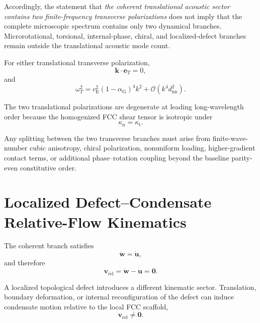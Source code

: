 Accordingly, the statement that \textit{the coherent translational acoustic sector contains two finite-frequency transverse polarizations} does not imply that the complete microscopic spectrum contains only two dynamical branches. Microrotational, torsional, internal-phase, chiral, and localized-defect branches remain outside the translational acoustic mode count.

For either translational transverse polarization,
\begin{equation}
    \mathbf{k}\cdot\mathbf{e}_T=0,
\end{equation}
and
\begin{equation}
    \omega_T^2 = c_{\mathrm{E}}^2 (1-\alpha_{\mathrm{G}})^4 k^2 + \mathcal{O}(k^4d_{\mathrm{nn}}^2).
\end{equation}

The two translational polarizations are degenerate at leading long-wavelength order because the homogenized FCC shear tensor is isotropic under
\begin{equation}
    \kappa_{\mathrm{n}} = \kappa_{\mathrm{t}}.
\end{equation}

Any splitting between the two transverse branches must arise from finite-wave-number cubic anisotropy, chiral polarization, nonuniform loading, higher-gradient contact terms, or additional phase--rotation coupling beyond the baseline parity-even constitutive order.

\section{Localized Defect--Condensate Relative-Flow Kinematics}

The coherent branch satisfies
\begin{equation}
    \dot{\mathbf{w}} = \dot{\mathbf{u}},
\end{equation}
and therefore
\begin{equation}
    \mathbf{v}_{\mathrm{rel}} = \dot{\mathbf{w}}-\dot{\mathbf{u}} = \mathbf{0}.
\end{equation}

A localized topological defect introduces a different kinematic sector. Translation, boundary deformation, or internal reconfiguration of the defect can induce condensate motion relative to the local FCC scaffold,
\begin{equation}
    \mathbf{v}_{\mathrm{rel}} \neq \mathbf{0}.
\end{equation}

